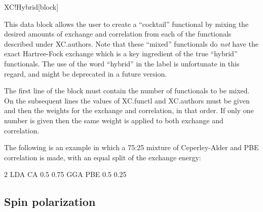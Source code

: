 \begin{fdfentry}{XC!Hybrid}[block]
  
  This data block allows the user to create a ``cocktail'' functional by
  mixing the desired amounts of exchange and correlation from each of
  the functionals described under XC.authors. Note that these ``mixed''
  functionals do \emph{not} have the exact Hartree-Fock exchange which
  is a key ingredient of the true ``hybrid'' functionals. The use of
  the word ``hybrid'' in the label is unfortunate in this regard, and
  might be deprecated in a future version.

  The first line of the block must contain the number of functionals to
  be mixed. On the subsequent lines the values of XC.functl and
  XC.authors must be given and then the weights for the exchange and
  correlation, in that order. If only one number is given then the same
  weight is applied to both exchange and correlation.

  The following is an example in which a 75:25 mixture of Ceperley-Alder
  and PBE correlation is made, with an equal split of the exchange
  energy:
  
  \begin{fdfexample}
        2
        LDA CA  0.5 0.75
        GGA PBE 0.5 0.25
  \end{fdfexample}

\end{fdfentry}



\subsection{Spin polarization}


